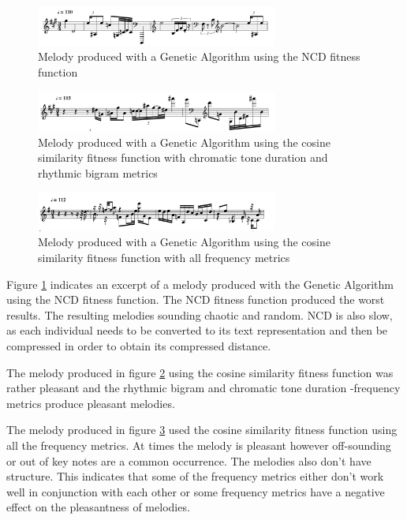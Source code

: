 \begin{figure}
\centerline{\includegraphics[width=300px]{../images/genetic_ncd.pdf}}
\caption{Melody produced with a Genetic Algorithm using the \ac{NCD} fitness function}
\label{ims:genetic_mel_ncd}
\end{figure}

\begin{figure}
\centerline{\includegraphics[width=300px]{../images/genetic_cosine_ctd_rb.pdf}}
\caption{Melody produced with a Genetic Algorithm using the cosine similarity fitness function with chromatic tone duration and rhythmic bigram metrics}
\label{ims:genetic_mel_ctdrb}
\end{figure}

\begin{figure}
\centerline{\includegraphics[width=300px]{../images/genetic_cosine_all.pdf}}
\caption{Melody produced with a Genetic Algorithm using the cosine similarity fitness function with all frequency metrics}
\label{ims:genetic_mel_mall}
\end{figure}

Figure \ref{ims:genetic_mel_ncd} indicates an excerpt of a melody produced with the Genetic Algorithm using the \ac{NCD} fitness function. The \ac{NCD} fitness function produced the worst results. The resulting melodies sounding chaotic and random. \ac{NCD} is also slow, as each individual needs to be converted to its text representation and then be compressed in order to obtain its compressed distance.

The melody produced in figure \ref{ims:genetic_mel_ctdrb} using the cosine similarity fitness function was rather pleasant and the rhythmic bigram and chromatic tone duration -frequency metrics produce pleasant melodies.

The melody produced in figure \ref{ims:genetic_mel_mall} used the cosine similarity fitness function using all the frequency metrics. At times the melody is pleasant however off-sounding or out of key notes are a common occurrence. The melodies also don't have structure. This indicates that some of the frequency metrics either don't work well in conjunction with each other or some frequency metrics have a negative effect on the pleasantness of melodies. 

